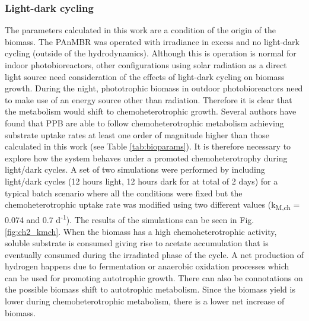 \subsubsection{Light-dark cycling}
The parameters calculated in this work are a condition of the origin of the biomass. The PAnMBR was operated with irradiance in excess and no light-dark cycling (outside of the hydrodynamics). Although this is operation is normal for indoor photobioreactors, other configurations using solar radiation as a direct light source need consideration of the effects of light-dark cycling on biomass growth. During the night, phototrophic biomass in outdoor photobioreactors need to make use of an energy source other than radiation. Therefore it is clear that the metabolism would shift to chemoheterotrophic growth. Several authors have found that PPB are able to follow chemoheterotrophic metabolism achieving substrate uptake rates at least one order of magnitude higher than those calculated in this work (see Table \ref{tab:bioparams}). It is therefore necessary to explore how the system behaves under a promoted chemoheterotrophy during light/dark cycles.
\skippingparagraph
A set of two simulations were performed by including light/dark cycles (12 hours light, 12 hours dark for at total of 2 days) for a typical batch scenario where all the conditions were fixed but the chemoheterotrophic uptake rate was modified using two different values (k\textsubscript{M,ch} = 0.074 and 0.7 d\textsuperscript{-1}). The results of the simulations can be seen in Fig. \ref{fig:ch2_kmch}.  When the biomass has a high chemoheterotrophic activity, soluble substrate is consumed giving rise to acetate accumulation that is eventually consumed during the irradiated phase of the cycle. A net production of hydrogen happens due to fermentation or anaerobic oxidation processes which can be used for promoting autotrophic growth. There can also be connotations on the possible biomass shift to autotrophic metabolism. Since the biomass yield is lower during chemoheterotrophic metabolism, there is a lower net increase of biomass. 

